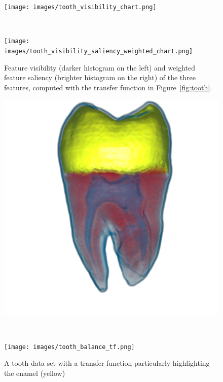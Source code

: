 \begin{figure}
	\centering
	\begin{minipage}{.45\textwidth}
		\texttt{[image: images/tooth\_visibility\_chart.png]}
	\end{minipage}~
	\begin{minipage}{.45\textwidth}
		\texttt{[image: images/tooth\_visibility\_saliency\_weighted\_chart.png]}
	\end{minipage}
	\caption{Feature visibility (darker histogram on the left) and weighted feature saliency (brighter histogram on the right) of the three features, computed with the transfer function in Figure~\ref{fig:tooth}.}
	\label{fig:tooth_saliency_chart}
\end{figure}

\begin{figure}
	\centering
	\begin{minipage}{.6\textwidth}
		\includegraphics[width=1\linewidth]{images/tooth_balance_gpu.png}
	\end{minipage}~
	\begin{minipage}{.3\textwidth}
		\texttt{[image: images/tooth\_balance\_tf.png]}
	\end{minipage}
	\caption{A tooth data set with a transfer function particularly highlighting the enamel (yellow)}
	\label{fig:tooth_2}
\end{figure}


